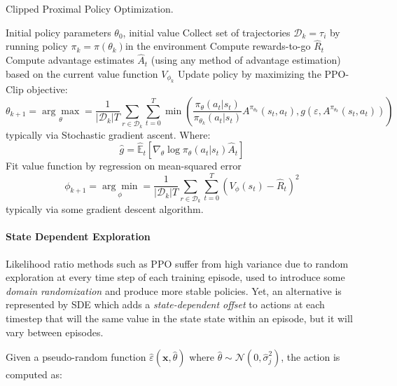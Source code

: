 \begin{algorithm}[H]
    \caption{Clipped Proximal Policy Optimization.}
    \label{alg:ppo}
    \begin{algorithmic}[1]
        \Require Initial policy parameters $\theta _0$, initial value
        \State Collect set of trajectories $\mathcal{D} _k = \tau _i$ by running policy $\pi _k = \pi(\theta _k)$in the environment
        \State Compute rewards-to-go $\hat{R} _t$
        \State Compute advantage estimates $\hat{A} _t$
        (using any method of advantage estimation) based on the current value function $V _{\phi _k}$
        \State Update policy by maximizing the PPO-Clip objective:
        $$
            \theta _{k + 1} = \underset{\theta}{\arg\max} = \frac{1}{|\mathcal{D} _k|T} \sum _{r \in \mathcal{D} _k} \sum _{t = 0} ^{T} \min \left( \frac{\pi _{\theta} (a _t | s _t)}{\pi _{\theta_k} (a _t | s _t)} A ^{\pi _{\theta_k}} (s _t, a _t), g(\varepsilon, A ^{\pi _{\theta_k}}(s _t, a _t)) \right)
        $$
        typically via Stochastic gradient ascent. Where:
        $$
            \hat{g} = \hat{\mathbb{E}} _t \left[\nabla _{\theta}\log\pi _{\theta}(a _t | s _t) \hat{A} _t\right]
        $$
        \State Fit value function by regression on mean-squared error
        $$
            \phi _{k + 1} = \underset{\phi}{\arg\min} = \frac{1}{|\mathcal{D} _k|T} \sum _{r \in \mathcal{D} _k} \sum _{t = 0} ^{T} \left(V _{\phi}(s _t) - \hat{R} _t \right)^2
        $$
        typically via some gradient descent algorithm.
        \EndFor
    \end{algorithmic}
\end{algorithm}


\paragraph{State Dependent Exploration} Likelihood ratio methods such as \ac{PPO} suffer from high variance due to random exploration at every time step of each training episode, used to introduce some \textit{domain randomization} and produce more stable policies. Yet, an alternative is represented by \ac{SDE} \citep{daelemans_state-dependent_2008, raffin_smooth_2021} which adds a \textit{state-dependent offset} to actions at each timestep that will the same value in the state state within an episode, but it will vary between episodes.

Given a pseudo-random function $\hat{\varepsilon}(\mathbf{x}, \hat{\theta})$ where $\hat{\theta} \sim \mathcal{N}(0, \hat{\sigma} _j ^2)$, the action is computed as:

